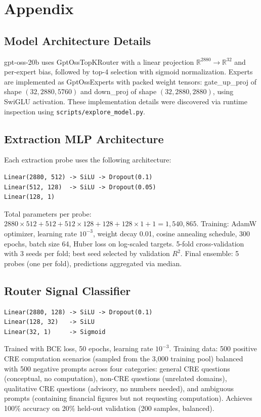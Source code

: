 \section{Appendix}
\label{sec:appendix}

\subsection{Model Architecture Details}
\label{sec:appendix:arch}

gpt-oss-20b uses GptOssTopKRouter with a linear projection
$\mathbb{R}^{2880} \to \mathbb{R}^{32}$ and per-expert bias, followed
by top-4 selection with sigmoid normalization. Experts are implemented
as GptOssExperts with packed weight tensors: gate\_up\_proj of shape
$(32, 2880, 5760)$ and down\_proj of shape $(32, 2880, 2880)$, using
SwiGLU activation. These implementation details were discovered via
runtime inspection using \texttt{scripts/explore\_model.py}.

\subsection{Extraction MLP Architecture}
\label{sec:appendix:extraction}

Each extraction probe uses the following architecture:
\begin{verbatim}
Linear(2880, 512) -> SiLU -> Dropout(0.1)
Linear(512, 128)  -> SiLU -> Dropout(0.05)
Linear(128, 1)
\end{verbatim}
Total parameters per probe: $2880 \times 512 + 512 + 512 \times 128 +
128 + 128 \times 1 + 1 = 1{,}540{,}865$.
Training: AdamW optimizer, learning rate $10^{-3}$, weight decay 0.01,
cosine annealing schedule, 300 epochs, batch size 64, Huber loss on
log-scaled targets. 5-fold cross-validation with 3 seeds per fold;
best seed selected by validation $R^2$. Final ensemble: 5 probes
(one per fold), predictions aggregated via median.

\subsection{Router Signal Classifier}
\label{sec:appendix:router}

\begin{verbatim}
Linear(2880, 128) -> SiLU -> Dropout(0.1)
Linear(128, 32)   -> SiLU
Linear(32, 1)     -> Sigmoid
\end{verbatim}
Trained with BCE loss, 50 epochs, learning rate $10^{-3}$.
Training data: 500 positive CRE computation scenarios (sampled from
the 3{,}000 training pool) balanced with 500 negative prompts across
four categories: general CRE questions (conceptual, no computation),
non-CRE questions (unrelated domains), qualitative CRE questions
(advisory, no numbers needed), and ambiguous prompts (containing
financial figures but not requesting computation). Achieves 100\%
accuracy on 20\% held-out validation (200 samples, balanced).

